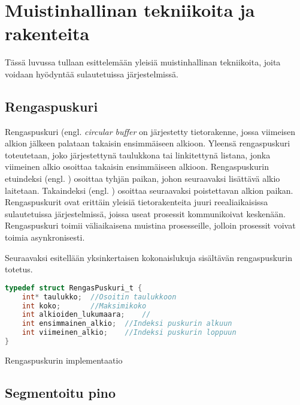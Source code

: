 \chapter{Muistinhallinan tekniikoita ja rakenteita} \label{Neljäs luku}

Tässä luvussa tullaan esittelemään yleisiä muistinhallinan tekniikoita, joita voidaan hyödyntää sulautetuissa järjestelmissä.

\section{Rengaspuskuri}

Rengaspuskuri (engl. \textit{circular buffer} on järjestetty tietorakenne, jossa viimeisen alkion jälkeen palataan takaisin ensimmäiseen alkioon. Yleensä rengaspuskuri toteutetaan, joko järjestettynä taulukkona tai linkitettynä listana, jonka viimeinen alkio osoittaa takaisin ensimmäiseen alkioon. Rengaspuskurin etuindeksi (engl. ) osoittaa tyhjän paikan, johon seuraavaksi lisättävä alkio laitetaan. Takaindeksi (engl. ) osoittaa seuraavaksi poistettavan alkion paikan. Rengaspuskurit ovat erittäin yleisiä tietorakenteita juuri reealiaikaisissa sulautetuissa järjestelmissä, joissa useat prosessit kommunikoivat keskenään. Rengaspuskuri toimii väliaikaisena muistina prosesseille, jolloin prosessit voivat toimia asynkronisesti.\cite{c2015book}

Seuraavaksi esitellään yksinkertaisen kokonaislukuja sisältävän rengaspuskurin totetus.

\begin{algorithm}[tbh]
\begin{lstlisting}[language=C]
typedef struct RengasPuskuri_t {
    int* taulukko;  //Osoitin taulukkoon
    int koko;       //Maksimikoko
    int alkioiden_lukumaara;    //
    int ensimmainen_alkio;  //Indeksi puskurin alkuun
    int viimeinen_alkio;    //Indeksi puskurin loppuun
}
\end{lstlisting}
\caption{Rengaspuskurin implementaatio\label{alg:Rengaspuskuri}}
\end{algorithm}

\section{Segmentoitu pino}

